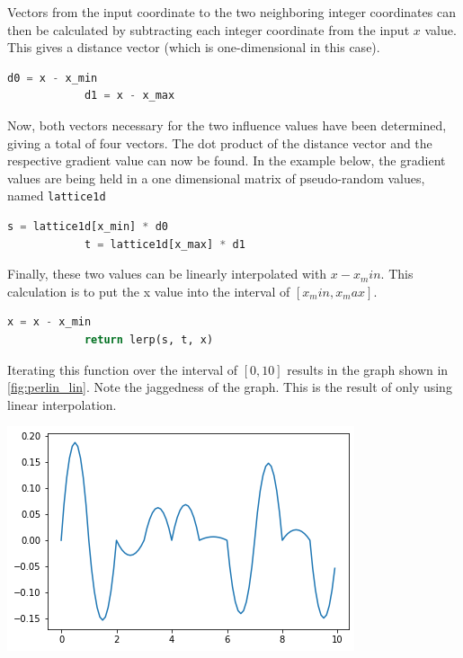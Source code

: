 \documentclass[10pt]{report}
\begin{document}
		Vectors from the input coordinate to the two neighboring integer coordinates can then be calculated by subtracting each integer coordinate from the input \(x\) value. This gives a distance vector (which is one-dimensional in this case).
	
		\begin{lstlisting}[label={lst:dst}, language=Python, frame=none, caption={Calculating the distance.}, captionpos=b]
			d0 = x - x_min
			d1 = x - x_max
		\end{lstlisting}
	
		Now, both vectors necessary for the two influence values have been determined, giving a total of four vectors. The dot product of the distance vector and the respective gradient value can now be found. In the example below, the gradient values are being held in a one dimensional matrix of pseudo-random values, named \lstinline|lattice1d|
		
		\begin{lstlisting}[label={lst:influence}, language=Python, frame=none, caption={Calculating the influence values.}, captionpos=b]
			s = lattice1d[x_min] * d0
			t = lattice1d[x_max] * d1
		\end{lstlisting}
	
		Finally, these two values can be linearly interpolated with \(x - x_min\). This calculation is to put the x value into the interval of \([x_min, x_max]\).
		
		\begin{lstlisting}[label={lst:perlin_linear}, language=Python, frame=none, caption={Linear interpolation of influence values}, captionpos=b]
			x = x - x_min
			return lerp(s, t, x)
		\end{lstlisting}
	
		Iterating this function over the interval of \([0,10]\) results in the graph shown in \ref{fig:perlin_lin}. Note the jaggedness of the graph. This is the result of only using linear interpolation.
		
		\begin{minipage}{\textwidth}
			\centering
			\includegraphics[scale=.5]{perlin_lin}
			\label{fig:perlin_lin}
		\end{minipage}
	
\end{document}
